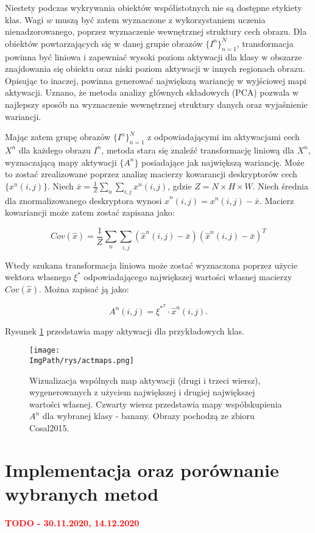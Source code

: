 \documentclass[a4paper,12pt,twoside,openany]{report}
\newcommand{\ImgPath}{.}
\begin{document}
Niestety podczas wykrywania obiektów współistotnych nie są dostępne etykiety klas. Wagi $w$ muszą być zatem wyznaczone z wykorzystaniem uczenia nienadzorowanego, poprzez wyznaczenie wewnętrznej struktury cech obrazu. Dla obiektów powtarzających się w danej grupie obrazów $\{I^n\}^N_{n=1}$, transformacja powinna być liniowa i zapewniać wysoki poziom aktywacji dla klasy w obszarze znajdowania się obiektu oraz niski poziom aktywacji w innych regionach obrazu. Opisując to inaczej, powinna generować największą wariancję w wyjściowej mapi aktywacji. Uznano, że metoda analizy głównych składowych (PCA) pozwala w najlepszy sposób na wyznaczenie wewnętrznej struktury danych oraz wyjaśnienie wariancji.

Mając zatem grupę obrazów $\{I^n\}^N_{n=1}$ z odpowiadającymi im aktywacjami cech $X^n$ dla każdego obrazu $I^n$, metoda stara się znaleźć transformację liniową dla $X^n$, wyznaczającą mapy aktywacji $\{A^n\}$ posiadające jak największą wariancję. Może to zostać zrealizowane poprzez analizę macierzy kowarancji deskryptorów cech $\{x^n(i,j)\}$. Niech $\bar{x} = \frac{1}{Z}\sum_n\sum_{i,j}x^n(i,j)$, gdzie $Z=N\times H\times W$. Niech średnia dla znormalizowanego deskryptora wynosi $\hat{x}^n(i,j) = x^n(i,j) - \bar{x}$. Macierz kowariancji może zatem zostać zapisana jako:

$$
Cov(\hat{x})=\frac{1}{Z}\sum_n\sum_{i,j}(\hat{x}^n(i,j) - \bar{x})(\hat{x}^n(i,j) - \bar{x})^T
$$

Wtedy szukana transformacja liniowa może zostać wyznaczona poprzez użycie wektora własnego $\xi^*$ odpowiadającego największej wartości własnej macierzy $Cov(\hat{x})$. Można zapisać ją jako:

$$
A^n(i,j) = \xi^{*^T} \cdot \hat{x}^n(i,j).
$$

Rysunek \ref{actmaps} przedstawia mapy aktywacji dla przykładowych klas. 

\begin{figure}[h]
	\centering
	\texttt{[image: \\ImgPath/rys/actmaps.png]}
	\caption{Wizualizacja wspólnych map aktywacji (drugi i trzeci wiersz), wygenerowanych z użyciem największej i drugiej największej wartości własnej. Czwarty wiersz przedstawia mapy współskupienia $A^n$ dla wybranej klasy - banany. Obrazy pochodzą ze zbioru Cosal2015.}
	\label{actmaps}
\end{figure}


\chapter{Implementacja oraz porównanie wybranych metod}
\textcolor{red}{\textbf{TODO - 30.11.2020, 14.12.2020}}
\end{document}
